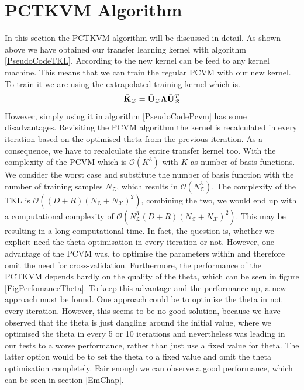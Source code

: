 \section{PCTKVM Algorithm}\label{InSecAlgo}
In this section the \acl{PCTKVM} algorithm will be discussed in detail.
As shown above we have obtained our transfer learning kernel with algorithm \ref{PseudoCodeTKL}.
According to \cite{Long.2015} the new kernel can be feed to any kernel machine.
This means that we can train the regular \acf{PCVM} with our new kernel.
To train it we are using the extrapolated training kernel which is.
\begin{equation}
	\bar{\mathbf{K}}_\mathcal{Z} = \bar{\mathbf{U}}_\mathcal{Z}\mathbf{\Lambda}\bar{\mathbf{U}}_\mathcal{Z}^T
\end{equation}
However, simply using it in algorithm \ref{PseudoCodePcvm} has some disadvantages.
Revisiting the \acs{PCVM} algorithm the kernel is recalculated in every iteration based on the optimised theta from the previous iteration.
As a consequence, we have to recalculate the entire transfer kernel too.
With the complexity of the \acs{PCVM} which is $\mathcal{O}(K^3)$ with $K$ as number of basis functions.
We consider the worst case and substitute the number of basis function with the number of training samples $N_\mathcal{Z}$, which results in $\mathcal{O}(N_\mathcal{Z}^3)$.
The complexity of the \acs{TKL} is $\mathcal{O}((D+R)(N_\mathcal{Z}+N_\mathcal{X})^2)$, combining the two, we would end up with a computational complexity of $\mathcal{O}(N_\mathcal{Z}^3(D+R)(N_\mathcal{Z}+N_\mathcal{X})^2)$.
This may be resulting in a long computational time.
In fact, the question is, whether we explicit need the theta optimisation in every iteration or not.
However, one advantage of the \acs{PCVM} was, to optimise the parameters within and therefore omit the need for cross-validation.
Furthermore, the performance of the \acs{PCTKVM} depends hardly on the quality of the theta, which can be seen in figure \ref{FigPerfomanceTheta}.
To keep this advantage and the performance up, a new approach must be found.
One approach could be to optimise the theta in not every iteration.
However, this seems to be no good solution, because we have observed that the theta is just dangling around the initial value, where we optimised the theta in every 5 or 10 iterations and nevertheless was leading in our tests to a worse performance, rather than just use a fixed value for theta.
The latter option would be to set the theta to a fixed value and omit the theta optimisation completely.
Fair enough we can observe a good performance, which can be seen in section \ref{EmChap}.
